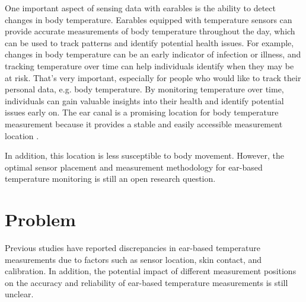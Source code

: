 One important aspect of sensing data with earables is the ability to detect changes in body temperature. 
Earables equipped with temperature sensors can provide accurate measurements of body temperature throughout the day, which can be used to track patterns and identify potential health issues. 
For example, changes in body temperature can be an early indicator of infection or illness, and tracking temperature over time can help individuals identify when they may be at risk.
That's very important, especially for people who would like to track their personal data, e.g. body temperature. 
By monitoring temperature over time, individuals can gain valuable insights into their health and identify potential issues early on.
The ear canal is a promising location for body temperature measurement because it provides a stable and easily accessible measurement location \cite{ericksonComparisonEarbasedBladder1993}.

In addition, this location is less susceptible to body movement. However, the optimal sensor placement and measurement methodology for ear-based temperature monitoring is still an open research question. %


\section{Problem}
Previous studies have reported discrepancies in ear-based temperature measurements due to factors such as sensor location, skin contact, and calibration. In addition, the potential impact of different measurement positions on the accuracy and reliability of ear-based temperature measurements is still unclear.

